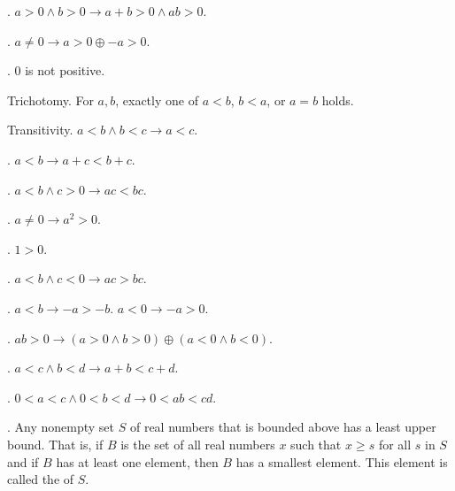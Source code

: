 \documentclass{slnotes}
\begin{document}
. \(a > 0 \land b > 0 \to a + b > 0 \land ab > 0\).

. \(a \neq 0 \to a > 0 \oplus -a > 0\).

. \(0\) is not positive.

 Trichotomy. For \(a, b\), exactly one of \(a < b\), \(b < a\), or \(a = b\) holds.

 Transitivity. \(a < b \land b < c \to a < c\).

. \(a < b \to a + c < b + c\).

. \(a < b \land c > 0 \to ac < bc\).

. \(a \neq 0 \to a^2 > 0\).

. \(1 > 0\).

. \(a < b \land c < 0 \to ac > bc\).

. \(a < b \to -a > -b\). \(a < 0 \to -a > 0\).

. \(ab > 0 \to (a > 0 \land b > 0) \oplus (a < 0 \land b < 0)\).

. \(a < c \land b < d \to a + b < c + d\).

. \(0 < a < c \land 0 < b < d \to 0 < ab < cd\).

. Any nonempty set \(S\) of real numbers that is bounded above has a least upper bound. That is, if \(B\) is the set of all real numbers \(x\) such that \(x \ge s\) for all \(s\) in \(S\) and if \(B\) has at least one element, then \(B\) has a smallest element. This element is called the  of \(S\).
\end{document}
